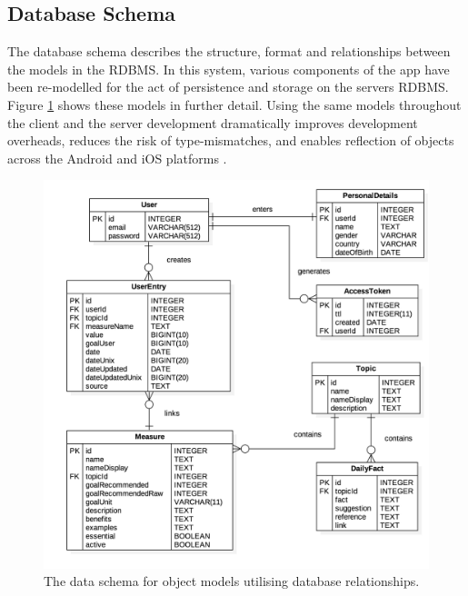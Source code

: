 \subsection{Database Schema}
The database schema describes the structure, format and relationships between the models in the RDBMS. In this system, various components of the app have been re-modelled for the act of persistence and storage on the servers RDBMS. Figure \ref{fig: database-model} shows these models in further detail. Using the same models throughout the client and the server development dramatically improves development overheads, reduces the risk of type-mismatches, and enables reflection of objects across the Android and iOS platforms \cite{Thalheim2000}.
\begin{figure}[h]
    \centering
    \includegraphics[scale=0.3, angle=0]{Files/prevention-study-1/figures/database-model}
    \caption{The data schema for object models utilising database relationships.}
    \label{fig: database-model}
\end{figure}

